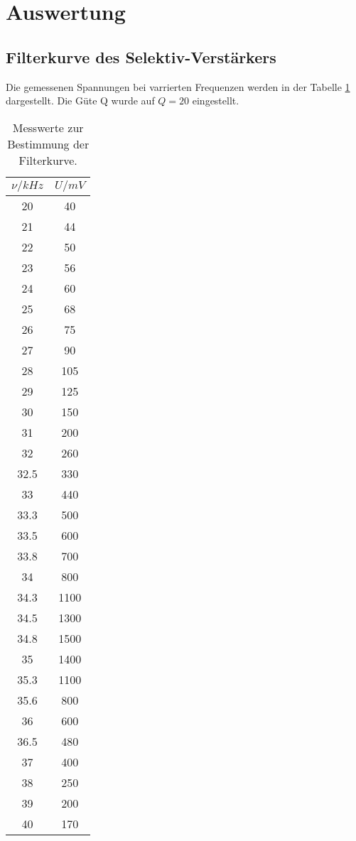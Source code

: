 \section{Auswertung}
\label{sec:Auswertung}

\subsection{Filterkurve des Selektiv-Verstärkers}

Die gemessenen Spannungen bei varrierten Frequenzen werden in der Tabelle \ref{tab:filter} dargestellt.
Die Güte Q wurde auf $Q = 20$ eingestellt.

\begin{table}[H]
    \centering
    \caption{Messwerte zur Bestimmung der Filterkurve.}
    \label{tab:filter}
    \begin{tabular}{c c}
        \toprule
        $\nu /kHz$ & $U / mV$ \\
        \midrule
        20    &  40   \\
        21    &  44   \\
        22    &  50   \\
        23    &  56   \\
        24    &  60   \\
        25    &  68   \\
        26    &  75   \\
        27    &  90   \\
        28    &  105  \\
        29    &  125  \\
        30    &  150  \\
        31    &  200  \\
        32    &  260  \\
        32.5  &  330  \\    
        33    &  440  \\
        33.3  &  500  \\ 
        33.5  &  600  \\
        33.8  &  700  \\
        34    &  800  \\
        34.3  &  1100  \\
        34.5  &  1300 \\
        34.8  &  1500 \\
        35    &  1400 \\
        35.3  &  1100 \\
        35.6  &  800 \\ 
        36    &  600 \\
        36.5  &  480 \\ 
        37    &  400 \\
        38    &  250 \\
        39    &  200 \\
        40    &  170 \\
        \bottomrule
    \end{tabular}
\end{table}

